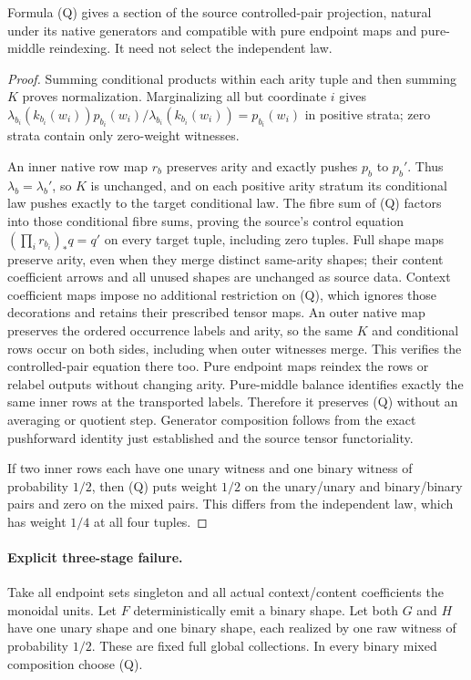 \documentclass{article}
\begin{document}
\begin{proposition}
Formula (Q) gives a section of the source controlled-pair projection, natural
under its native generators and compatible with pure endpoint maps and
pure-middle reindexing. It need not select the independent law.
\end{proposition}
\begin{proof}
Summing conditional products within each arity tuple and then summing $K$
proves normalization. Marginalizing all but coordinate $i$ gives
$\lambda_{b_i}(k_{b_i}(w_i))p_{b_i}(w_i)/
\lambda_{b_i}(k_{b_i}(w_i))=p_{b_i}(w_i)$ in positive strata;
zero strata contain only zero-weight witnesses.

An inner native row map $r_b$ preserves arity and exactly pushes $p_b$ to
$p_b'$. Thus $\lambda_b=\lambda_b'$, so $K$ is unchanged, and on each
positive arity stratum its conditional law pushes exactly to the target
conditional law. The fibre sum of (Q) factors into those conditional fibre
sums, proving the source's control equation
$(\prod_i r_{b_i})_*q=q'$ on every target tuple, including zero tuples.
Full shape maps preserve arity, even when they merge distinct same-arity
shapes; their content coefficient arrows and all unused shapes are unchanged
as source data. Context coefficient maps impose no additional restriction
on (Q), which ignores those decorations and retains their prescribed tensor
maps. An outer native map preserves the ordered occurrence labels and arity,
so the same $K$ and conditional rows occur on both sides, including when
outer witnesses merge. This verifies the controlled-pair equation there too.
Pure endpoint maps reindex the rows or relabel outputs without changing
arity. Pure-middle balance identifies exactly the same inner rows at the
transported labels. Therefore it preserves (Q) without an averaging or
quotient step. Generator composition follows from the exact pushforward
identity just established and the source tensor functoriality.

If two inner rows each have one unary witness and one binary witness of
probability $1/2$, then (Q) puts weight $1/2$ on the unary/unary and
binary/binary pairs and zero on the mixed pairs. This differs from the
independent law, which has weight $1/4$ at all four tuples.
\end{proof}

\paragraph{Explicit three-stage failure.}
Take all endpoint sets singleton and all actual context/content coefficients
the monoidal units. Let $F$ deterministically emit a binary shape.
Let both $G$ and $H$ have one unary shape and one binary shape, each realized
by one raw witness of probability $1/2$. These are fixed full global
collections. In every binary mixed composition choose (Q).
\end{document}
